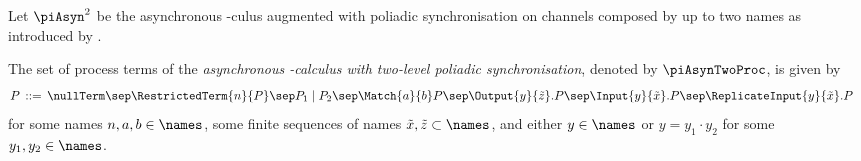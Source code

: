 \documentclass[]{llncs}
\begin{document}
Let $ \piAsyn^2 $ be the asynchronous \piCal-culus augmented with poliadic synchronisation on channels composed by up to two names as introduced by \cite{carboneMaffeis03}.

\begin{definition}[$ \piAsyn^2 $]
  The set of process terms of the \emph{asynchronous \piCal-calculus with two-level poliadic synchronisation}, denoted by $ \piAsynTwoProc $, is given by
	\begin{align*}
		P & \;\mathop{::=}\;
				\nullTerm
                \sep \RestrictedTerm{n}{P}
                \sep P_1 \mid P_2
                \sep \Match{a}{b}P
                \sep \Output{y}{\tilde{z}}.P
                \sep \Input{y}{\tilde{x}}.P
                \sep \ReplicateInput{y}{\tilde{x}}.P
	\end{align*}
	for some names $ n, a, b \in \names $, some finite sequences of names $ \tilde{x}, \tilde{z} \subset \names $, and either $ y \in \names $ or $ y = y_1 \cdot y_2 $ for some $ y_1, y_2 \in \names $.
\end{definition}
\end{document}
